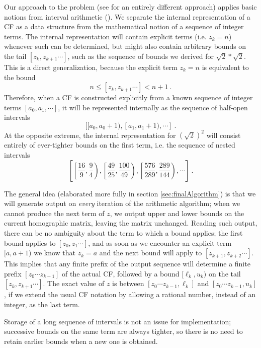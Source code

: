 \documentclass[11pt, oneside]{amsart}   	%
\renewcommand{\:}{\negthickspace:\negthickspace}
\begin{document}
Our approach to the problem (see \cite{Lester01} for an entirely different approach)
applies basic notions from interval arithmetic (\cite{doi:10.1137/1.9780898717716,Mayer+2017}).
We separate the internal representation of a CF as a data structure from the mathematical notion of a  sequence of integer terms. The
internal representation will contain explicit terms (i.e. $z_k=n$) whenever such can be determined, but might also contain arbitrary
bounds on the tail $[z_k, z_{k+1}\cdots]$, such as the  sequence of bounds we derived for $\sqrt{2}*\sqrt{2}$. This is a direct
generalization, because the explicit term  $z_k=n$ is equivalent to the bound 
\[
n \leq [z_k, z_{k+1}\cdots] < n+1 \ .
\]
Therefore, when a CF is constructed explicitly from a known sequence of integer terms $[a_0, a_1, \cdots]$,
it will be represented internally as the sequence of half-open intervals
\[
[[a_0, a_0+1),  [a_1, a_1+1), \cdots]\ .
\] 
At the opposite extreme, the internal representation for $(\sqrt{2})^2$ will consist entirely of ever-tighter bounds on the first term, i.e. the sequence of nested intervals
\[
\left[ \left[\frac{16}{9},\frac{9}{4}\right), \left[\frac{49}{25},\frac{100}{49}\right), \left[\frac{576}{289},\frac{289}{144}\right), \cdots\right ]\ .
\] 

The general idea (elaborated more fully in section \ref{sec:finalAlgorithm}) is that we will generate output on \emph{every}
 iteration of the arithmetic algorithm; when we cannot produce the next term of $z$, we output upper and lower bounds on the current
 homographic matrix, leaving the matrix unchanged. Reading such output, there can be no ambiguity about the term to which a bound 
 applies; the first bound applies to $[z_0,z_1\cdots]$, and as soon as we encounter an explicit term $[a,a+1)$ we know that $z_k=a$ and the next bound will apply to $[z_{k+1}, z_{k+2}\cdots]$. 
 This implies that any finite prefix of the output sequence will determine a finite prefix $[z_0 \cdots z_{k-1}]$ of the actual CF, followed by a bound
 $[\ell_k,u_k)$ on the tail $[z_k, z_{k+1}\cdots]$. The exact value of $z$ is between $[z_0 \cdots z_{k-1}, \ell_k]$ and
 $[z_0 \cdots z_{k-1}, u_k]$, if we extend the usual CF notation by allowing a rational number, instead of an integer, as the last term.

Storage of a long sequence of intervals is not an issue for implementation;
successive bounds on the same term are always tighter, so there is no need to retain earlier bounds when a new one is obtained. 
\end{document}
